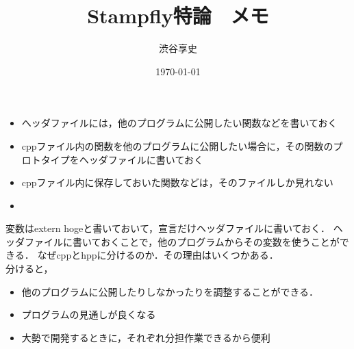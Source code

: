 \documentclass[a4paper,11pt]{jsarticle}
\begin{document}
\title{Stampfly特論　メモ}
\author{渋谷享史}
\date{\today}
\maketitle

\begin{itemize}
  \item へッダファイルには，他のプログラムに公開したい関数などを書いておく
  \item cppファイル内の関数を他のプログラムに公開したい場合に，その関数のプロトタイプをヘッダファイルに書いておく
  \item cppファイル内に保存しておいた関数などは，そのファイルしか見れない
  \item 
\end{itemize}


変数はextern hogeと書いておいて，宣言だけヘッダファイルに書いておく．
ヘッダファイルに書いておくことで，他のプログラムからその変数を使うことができる．
なぜcppとhppに分けるのか．その理由はいくつかある．
\\分けると，
\begin{itemize}
  \item 他のプログラムに公開したりしなかったりを調整することができる．
  \item プログラムの見通しが良くなる
  \item 大勢で開発するときに，それぞれ分担作業できるから便利
\end{itemize}
\end{document}
